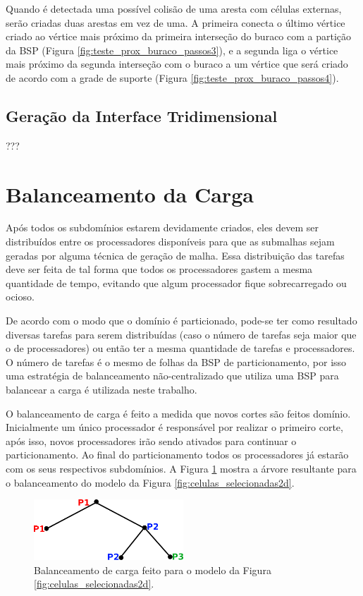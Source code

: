 Quando é detectada uma possível colisão de uma aresta com células externas, serão criadas duas arestas em vez de uma. A primeira conecta o último vértice criado ao vértice mais próximo da primeira interseção do buraco com a partição da BSP (Figura \ref{fig:teste_prox_buraco_passos3}), e a segunda liga o vértice mais próximo da segunda interseção com o buraco a um vértice que será criado de acordo com a grade de suporte (Figura \ref{fig:teste_prox_buraco_passos4}).

\subsection{Geração da Interface Tridimensional}

???

\section{Balanceamento da Carga}
\label{sec:Balanceamento_de_Carga}


Após todos os subdomínios estarem devidamente criados, eles devem ser distribuídos entre os processadores disponíveis para que as submalhas sejam geradas por alguma técnica de geração de malha. Essa distribuição das tarefas deve ser feita de tal forma que todos os processadores gastem a mesma quantidade de tempo, evitando que algum processador fique sobrecarregado ou ocioso.

De acordo com o modo que o domínio é particionado, pode-se ter como resultado diversas tarefas para serem distribuídas (caso o número de tarefas seja maior que o de processadores) ou então ter a mesma quantidade de tarefas e processadores. O número de tarefas é o mesmo de folhas da BSP de particionamento, por isso uma estratégia de balanceamento não-centralizado que utiliza uma BSP para balancear a carga é utilizada neste trabalho.

O balanceamento de carga é feito a medida que novos cortes são feitos domínio. Inicialmente um único processador é responsável por realizar o primeiro corte, após isso, novos processadores irão sendo ativados para continuar o particionamento. Ao final do particionamento todos os processadores já estarão com os seus respectivos subdomínios. A Figura \ref{fig:arvore_balanceamento} mostra a árvore resultante para o balanceamento do modelo da Figura \ref{fig:celulas_selecionadas2d}.


\begin{figure}[!ht]
	\centering
	\includegraphics[width=0.5\textwidth]{fig/arvore_balanceamento.png}
	\caption{Balanceamento de carga feito para o modelo da Figura \ref{fig:celulas_selecionadas2d}.}
	\label{fig:arvore_balanceamento}
\end{figure}


